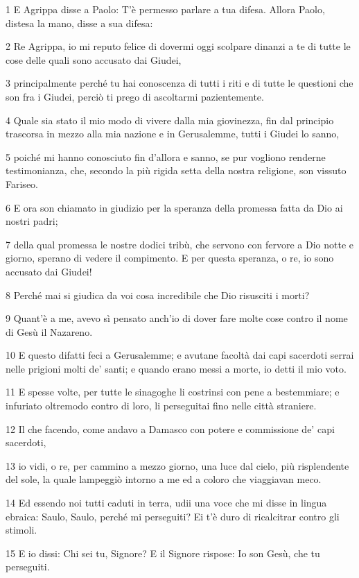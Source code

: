 \par 1 E Agrippa disse a Paolo: T'è permesso parlare a tua difesa. Allora Paolo, distesa la mano, disse a sua difesa:
\par 2 Re Agrippa, io mi reputo felice di dovermi oggi scolpare dinanzi a te di tutte le cose delle quali sono accusato dai Giudei,
\par 3 principalmente perché tu hai conoscenza di tutti i riti e di tutte le questioni che son fra i Giudei, perciò ti prego di ascoltarmi pazientemente.
\par 4 Quale sia stato il mio modo di vivere dalla mia giovinezza, fin dal principio trascorsa in mezzo alla mia nazione e in Gerusalemme, tutti i Giudei lo sanno,
\par 5 poiché mi hanno conosciuto fin d'allora e sanno, se pur vogliono renderne testimonianza, che, secondo la più rigida setta della nostra religione, son vissuto Fariseo.
\par 6 E ora son chiamato in giudizio per la speranza della promessa fatta da Dio ai nostri padri;
\par 7 della qual promessa le nostre dodici tribù, che servono con fervore a Dio notte e giorno, sperano di vedere il compimento. E per questa speranza, o re, io sono accusato dai Giudei!
\par 8 Perché mai si giudica da voi cosa incredibile che Dio risusciti i morti?
\par 9 Quant'è a me, avevo sì pensato anch'io di dover fare molte cose contro il nome di Gesù il Nazareno.
\par 10 E questo difatti feci a Gerusalemme; e avutane facoltà dai capi sacerdoti serrai nelle prigioni molti de' santi; e quando erano messi a morte, io detti il mio voto.
\par 11 E spesse volte, per tutte le sinagoghe li costrinsi con pene a bestemmiare; e infuriato oltremodo contro di loro, li perseguitai fino nelle città straniere.
\par 12 Il che facendo, come andavo a Damasco con potere e commissione de' capi sacerdoti,
\par 13 io vidi, o re, per cammino a mezzo giorno, una luce dal cielo, più risplendente del sole, la quale lampeggiò intorno a me ed a coloro che viaggiavan meco.
\par 14 Ed essendo noi tutti caduti in terra, udii una voce che mi disse in lingua ebraica: Saulo, Saulo, perché mi perseguiti? Ei t'è duro di ricalcitrar contro gli stimoli.
\par 15 E io dissi: Chi sei tu, Signore? E il Signore rispose: Io son Gesù, che tu perseguiti.
